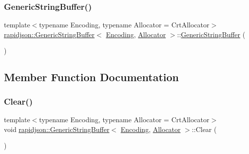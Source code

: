 \subsubsection{\texorpdfstring{GenericStringBuffer()}{GenericStringBuffer()}\hspace{0.1cm}{\footnotesize\ttfamily [2/2]}}
{\footnotesize\ttfamily template$<$typename Encoding, typename Allocator = Crt\+Allocator$>$ \\
\mbox{\hyperlink{classrapidjson_1_1_generic_string_buffer}{rapidjson\+::\+Generic\+String\+Buffer}}$<$ \mbox{\hyperlink{classrapidjson_1_1_encoding}{Encoding}}, \mbox{\hyperlink{classrapidjson_1_1_allocator}{Allocator}} $>$\+::\mbox{\hyperlink{classrapidjson_1_1_generic_string_buffer}{Generic\+String\+Buffer}} (\begin{DoxyParamCaption}\item[{const \mbox{\hyperlink{classrapidjson_1_1_generic_string_buffer}{Generic\+String\+Buffer}}$<$ \mbox{\hyperlink{classrapidjson_1_1_encoding}{Encoding}}, \mbox{\hyperlink{classrapidjson_1_1_allocator}{Allocator}} $>$ \&}]{ }\end{DoxyParamCaption})\hspace{0.3cm}{\ttfamily [private]}}



\subsection{Member Function Documentation}
\mbox{\label{classrapidjson_1_1_generic_string_buffer_a614af5a72984c88bd5a65e2bc233d310}} 
\subsubsection{\texorpdfstring{Clear()}{Clear()}}
{\footnotesize\ttfamily template$<$typename Encoding, typename Allocator = Crt\+Allocator$>$ \\
void \mbox{\hyperlink{classrapidjson_1_1_generic_string_buffer}{rapidjson\+::\+Generic\+String\+Buffer}}$<$ \mbox{\hyperlink{classrapidjson_1_1_encoding}{Encoding}}, \mbox{\hyperlink{classrapidjson_1_1_allocator}{Allocator}} $>$\+::Clear (\begin{DoxyParamCaption}{ }\end{DoxyParamCaption})}



